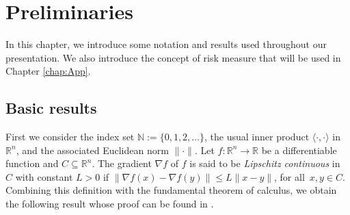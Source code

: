 \chapter{Preliminaries}  \label{chap:Prel}

In this chapter, we introduce  some notation and results used throughout our presentation. We also introduce the concept of risk measure that will be used in Chapter \ref{chap:App}.

\section{Basic results}

First we  consider the  index set  ${\mathbb{N}}:=\{0,1,2,\ldots\}$,  the usual inner  product  $\langle \cdot,\cdot \rangle$ in $\mathbb{R}^n$, and the associated Euclidean norm    $\|\cdot\|$.
Let  $f:\mathbb{R}^n \to \mathbb{R}$ be a differentiable function and $C \subseteq \mathbb{R}^n$. The  gradient $\nabla f$ of $f$ is said to be {\it Lipschitz continuous} in $C$ with constant $L>0$ if $\|\nabla f(x)-\nabla f(y)\|\leq L \|x-y\|$, for all~$x, y\in C$. Combining this definition with the fundamental theorem of calculus, we obtain the following result whose proof can be found in \cite[Proposition A.24]{Bertsekas1999}.

